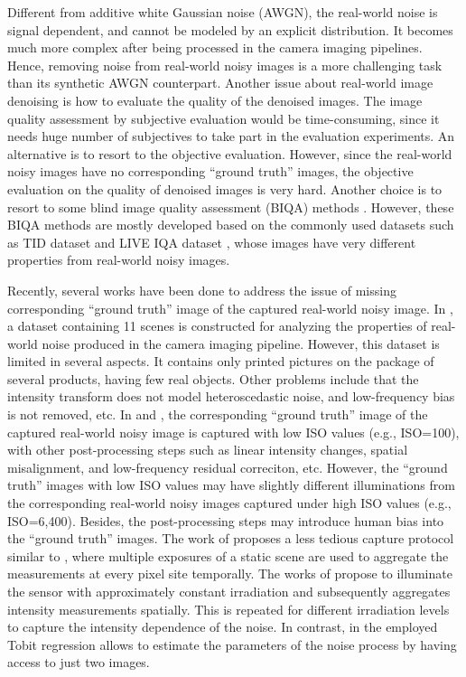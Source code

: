 Different from additive white Gaussian noise (AWGN), the real-world noise is signal dependent, and cannot be modeled by an explicit distribution. It becomes much more complex after being processed in the camera imaging pipelines. Hence, removing noise from real-world noisy images is a more challenging task than its synthetic AWGN counterpart. Another issue about real-world image denoising is how to evaluate the quality of the denoised images. The image quality assessment by subjective evaluation would be time-consuming, since it needs huge number of subjectives to take part in the evaluation experiments. An alternative is to resort to the objective evaluation. However, since the real-world noisy images have no corresponding ``ground truth'' images, the objective evaluation on the quality of denoised images is very hard. Another choice is to resort to some blind image quality assessment (BIQA) methods \cite{bliinds,biqi}. However, these BIQA methods are mostly developed based on the commonly used datasets such as TID dataset \cite{tid2008} and LIVE IQA dataset \cite{LIVEIQA}, whose images have very different properties from real-world noisy images.

Recently, several works have been done to address the issue of missing corresponding ``ground truth'' image of the captured real-world noisy image. In \cite{crosschannel2016}, a dataset containing 11 scenes is constructed for analyzing the properties of real-world noise produced in the camera imaging pipeline. However, this dataset is limited in several aspects. It contains only printed pictures on the package of several products, having few real objects. Other problems include that the intensity transform does not model heteroscedastic noise, and low-frequency bias is not removed, etc. In \cite{RENOIR2014} and \cite{dnd2017}, the corresponding ``ground truth'' image of the captured real-world noisy image is captured with low ISO values (e.g., ISO=100), with other post-processing steps such as linear intensity changes, spatial misalignment, and low-frequency residual correciton, etc. However, the ``ground truth'' images with low ISO values may have slightly different illuminations from the corresponding real-world noisy images captured under high ISO values (e.g., ISO=6,400). Besides, the post-processing steps may introduce human bias into the ``ground truth'' images. The work of \cite{EMVA1288} proposes a less tedious capture protocol similar to \cite{dnd2017}, where multiple exposures of a static scene are used to aggregate the measurements at every pixel site temporally. The works of \cite{noisemeasurement,moldovan2006denoising} propose to illuminate the sensor with approximately constant irradiation and subsequently aggregates intensity measurements spatially. This is repeated for different irradiation levels to capture the intensity dependence of the noise. In contrast, in \cite{dnd2017} the employed Tobit regression allows to estimate the parameters of the noise process by having access to just two images.

